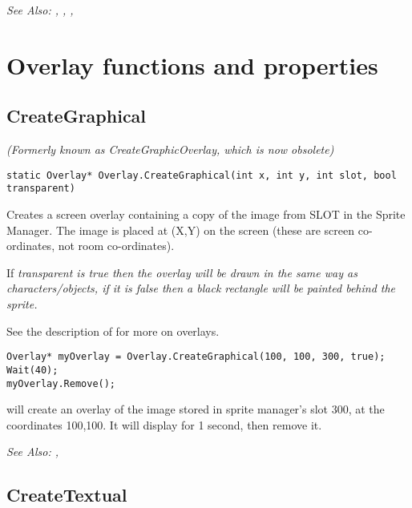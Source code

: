 \it{See Also:} ,
, ,




\section{Overlay functions and properties}%


\subsection{CreateGraphical}\label{Overlay.CreateGraphical}%

\it{(Formerly known as CreateGraphicOverlay, which is now obsolete)}

\begin{verbatim}
static Overlay* Overlay.CreateGraphical(int x, int y, int slot, bool transparent)
\end{verbatim}
Creates a screen overlay containing a copy of the image from SLOT in
the Sprite Manager. The image is placed at (X,Y) on the screen (these are
screen co-ordinates, not room co-ordinates).

If \it{transparent} is true then the overlay will be drawn in the
same way as characters/objects, if it is false
then a black rectangle will be painted behind the sprite.

See the description of  for more on overlays.

\begin{verbatim}
Overlay* myOverlay = Overlay.CreateGraphical(100, 100, 300, true);
Wait(40);
myOverlay.Remove();
\end{verbatim}
will create an overlay of the image stored in sprite manager's slot 300, at the
coordinates 100,100. It will display for 1 second, then remove it.

\it{See Also:} ,


\subsection{CreateTextual}\label{Overlay.CreateTextual}%

